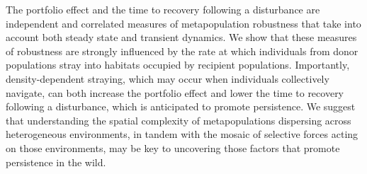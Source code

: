 \documentclass{revtex4}
\begin{document}

The portfolio effect and the time to recovery following a disturbance are independent and correlated measures of metapopulation robustness that take into account both steady state and transient dynamics.
We show that these measures of robustness are strongly influenced by the rate at which individuals from donor populations stray into habitats occupied by recipient populations. 
Importantly, density-dependent straying, which may occur when individuals collectively navigate, can both increase the portfolio effect and lower the time to recovery following a disturbance, which is anticipated to promote persistence. 
We suggest that understanding the spatial complexity of metapopulations dispersing across heterogeneous environments, in tandem with the mosaic of selective forces acting on those environments, may be key to uncovering those factors that promote persistence in the wild.




% 
% 
\end{document}
